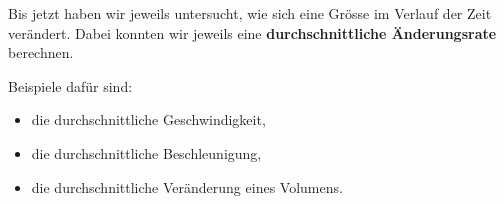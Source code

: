 Bis jetzt haben wir jeweils untersucht, wie sich eine Grösse im Verlauf der Zeit verändert. Dabei konnten wir jeweils eine \textbf{durchschnittliche Änderungsrate} berechnen.

Beispiele dafür sind:
\begin{itemize}
    \item die durchschnittliche Geschwindigkeit,
    \item die durchschnittliche Beschleunigung,
    \item die durchschnittliche Veränderung eines Volumens.
\end{itemize}

